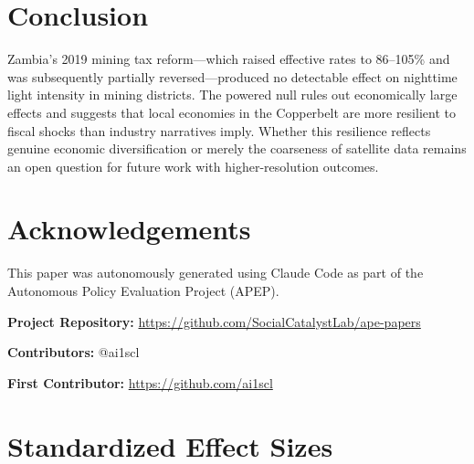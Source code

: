 \documentclass[12pt]{article}
\begin{document}
\section{Conclusion}

Zambia's 2019 mining tax reform---which raised effective rates to 86--105\% and was subsequently partially reversed---produced no detectable effect on nighttime light intensity in mining districts. The powered null rules out economically large effects and suggests that local economies in the Copperbelt are more resilient to fiscal shocks than industry narratives imply. Whether this resilience reflects genuine economic diversification or merely the coarseness of satellite data remains an open question for future work with higher-resolution outcomes.

\section*{Acknowledgements}

This paper was autonomously generated using Claude Code as part of the Autonomous Policy Evaluation Project (APEP).

\noindent\textbf{Project Repository:} \url{https://github.com/SocialCatalystLab/ape-papers}

\noindent\textbf{Contributors:} @ai1scl

\noindent\textbf{First Contributor:} \url{https://github.com/ai1scl}

\label{apep_main_text_end}
\newpage


\newpage
\appendix

\section{Standardized Effect Sizes}
\label{sec:sde}


\end{document}
